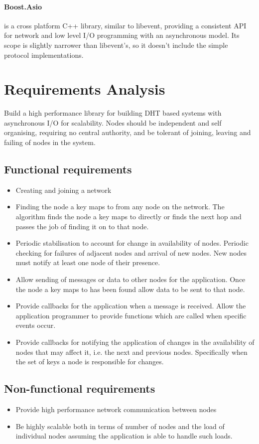 \documentclass{article}
\begin{document}
\paragraph{Boost.Asio} \cite{basio} is a cross platform C++ library, similar to libevent, providing a consistent API for network and low level I/O programming with an asynchronous model. Its scope is slightly narrower than libevent's, so it doesn't include the simple protocol implementations.




\section{Requirements Analysis}
Build a high performance library for building DHT based systems with asynchronous I/O for scalability. Nodes should be independent and self organising, requiring no central authority, and be tolerant of joining, leaving and failing of nodes in the system.

\subsection{Functional requirements}
\begin{itemize}
\item
Creating and joining a network
\item
Finding the node a key maps to from any node on the network.
The algorithm finds the node a key maps to directly or finds the next hop and passes the job of finding it on to that node.
\item
Periodic stabilisation to account for change in availability of nodes.
Periodic checking for failures of adjacent nodes and arrival of new nodes. New nodes must notify at least one node of their presence.
\item
Allow sending of messages or data to other nodes for the application.
Once the node a key maps to has been found allow data to be sent to that node.
\item
Provide callbacks for the application when a message is received.
Allow the application programmer to provide functions which are called when specific events occur.
\item
Provide callbacks for notifying the application of changes in the availability of nodes that may affect it, i.e. the next and previous nodes. Specifically when the set of keys a node is responsible for changes.
\end{itemize}


\subsection{Non-functional requirements}
\begin{itemize}
\item
Provide high performance network communication between nodes
\item
Be highly scalable both in terms of number of nodes and the load of individual nodes assuming the application is able to handle such loads.
\end{itemize}
\end{document}
